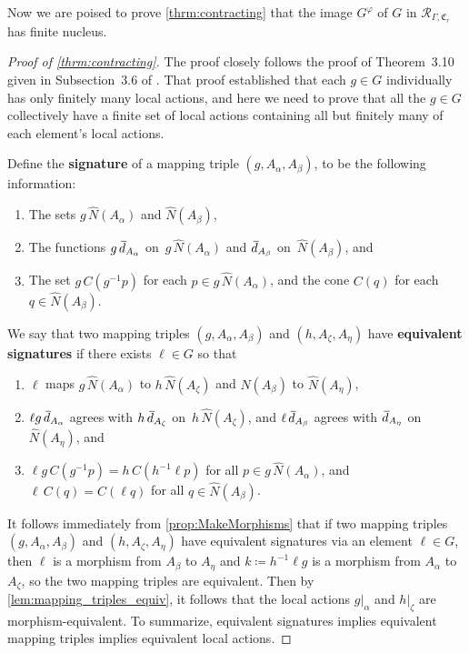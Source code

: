 \documentclass[11pt,letterpaper]{amsart}
\theoremstyle{definition}
\newcommand{\newword}[1]{\textbf{#1}}
\newcommand{\R}{\mathcal{R}}
\newcommand{\C}{\mathfrak{C}}
\newcommand{\od}{\mkern 3mu\overline{\mkern-3mu d\mkern 1.5mu}\mkern-1.5mu}
\begin{document}
Now we are poised to prove \cref{thrm:contracting} that the image $G^\varphi$ of $G$ in $\R_{\Gamma,\C_r}$ has finite nucleus.

\begin{proof}[Proof of \cref{thrm:contracting}]
The proof closely follows the proof of Theorem~3.10 given in Subsection~3.6 of \cite{BelkBleakMatucci}. That proof established that each $g\in G$ individually has only finitely many local actions, and here we need to prove that all the $g\in G$ collectively have a finite set of local actions containing all but finitely many of each element's local actions.

Define the \newword{signature} of a mapping triple $(g,A_\alpha,A_\beta)$, to be the following information:
\begin{enumerate}
\item The sets $g\,\widehat{N}(A_\alpha)$ and $\widehat{N}(A_\beta)$,\smallskip
\item The functions $g\,\od_{A_\alpha}$ on~$g\,\widehat{N}(A_\alpha)$ and $\od_{A_\beta}$ on~$\widehat{N}(A_\beta)$, and\smallskip
\item The set $g\,C(g^{-1}p)$ for each $p\in g\,\widehat{N}(A_\alpha)$, and the cone $C(q)$ for each $q\in \widehat{N}(A_\beta)$.
\end{enumerate}

We say that two mapping triples $(g,A_\alpha,A_\beta)$ and $(h,A_\zeta,A_\eta)$ have \newword{equivalent signatures} if there exists $\ell\in G$ so that
\begin{enumerate}
\item
$\ell$ maps $g\,\widehat{N}(A_\alpha)$ to $h\,\widehat{N}(A_\zeta)$ and $\widehat{N}(A_\beta)$ to $\widehat{N}(A_\eta)$,\smallskip
\item $\ell g\,\od_{A_\alpha}$ agrees with $h\,\od_{A_\zeta}$ on~$h\,\widehat{N}(A_\zeta)$, and $\ell\,\od_{A_\beta}$ agrees with $\od_{A_\eta}$ on~$\widehat{N}(A_\eta)$, and\smallskip
\item $\ell g\,C(g^{-1}p) = h\,C(h^{-1}\ell p)$ for all $p\in g\,\widehat{N}(A_\alpha)$, and $\ell\,C(q) = C(\ell q)$ for all $q\in \widehat{N}(A_\beta)$.
\end{enumerate}
It follows immediately from \cref{prop:MakeMorphisms} that if two mapping triples $(g,A_\alpha,A_\beta)$ and $(h,A_\zeta,A_\eta)$ have equivalent signatures via an element $\ell\in G$, then $\ell$ is a morphism from $A_\beta$ to $A_\eta$ and $k\coloneqq h^{-1}\ell g$ is a morphism from $A_\alpha$ to~$A_\zeta$, so the two mapping triples are equivalent.  Then by \cref{lem:mapping_triples_equiv}, it follows that the local actions $g|_\alpha$ and $h|_\zeta$ are morphism-equivalent. To summarize, equivalent signatures implies equivalent mapping triples implies equivalent local actions.


\end{proof}
\end{document}
